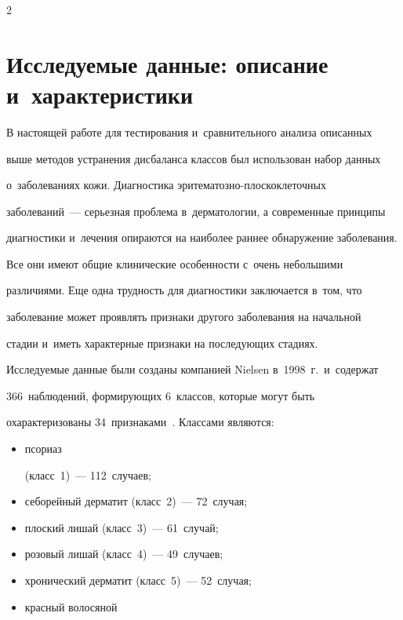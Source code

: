 \begin{multicols}{2}
  

\section{Исследуемые данные: описание и~характеристики}



  В настоящей работе для тестирования и~сравнительного анализа описанных 

выше методов устранения дисбаланса классов был использован набор данных 

о~заболеваниях кожи. Диагностика эри\-те\-ма\-тоз\-но-плос\-ко\-кле\-точ\-ных 

заболеваний~--- серь\-ез\-ная проб\-ле\-ма в~дерматологии, а современные принципы 

диагностики и~лечения опираются на наиболее раннее обнаружение заболевания. 

Все они имеют общие клинические особенности с~очень небольшими 

различиями. Еще одна трудность для диагностики заключается в~том, что 

заболевание может проявлять признаки другого заболевания на начальной 

стадии и~иметь характерные признаки на последующих стадиях. 

  

  Исследуемые данные были созданы компанией Nielsen в~1998~г.\ и~содержат 

366~наблюдений, формирующих 6~классов, которые могут быть 

охарактеризованы 34~признаками~\cite{8-sev}. Классами являются: 

\begin{itemize}

\item псориаз 

(класс~1)~--- 112~случаев; 

\item себорейный дерматит (класс~2)~--- 72~случая; 

\item плоский лишай (класс~3)~--- 61~случай; 

\item розовый лишай (класс~4)~--- 49~случаев; 

\item хронический дерматит (класс~5)~--- 52~случая; 

\item красный волосяной 


\end{itemize}
\end{multicols}
